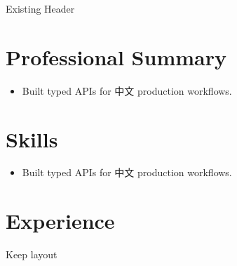\documentclass{article}
\newcommand{\resumeHeader}[1]{#1}
\begin{document}
\resumeHeader{Existing Header}
\section{Professional Summary}
\begin{itemize}
\item Built typed APIs for 中文 production workflows.
\end{itemize}
\section{Skills}
\begin{itemize}
\item Built typed APIs for 中文 production workflows.
\end{itemize}
\section{Experience}
Keep layout
\end{document}
